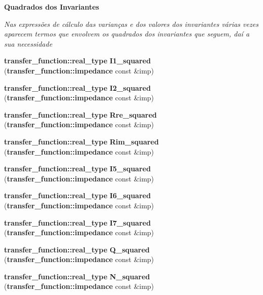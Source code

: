 \begin{Indent}{\bf Quadrados dos Invariantes}\par
{\em Nas expressões de cálculo das varianças e dos valores dos invariantes várias vezes aparecem termos que envolvem os quadrados dos invariantes que seguem, daí a sua necessidade }\begin{CompactItemize}
\item 
{\bf transfer\_\-function::real\_\-type} \textbf{I1\_\-squared} ({\bf transfer\_\-function::impedance} const \&imp)\label{namespaceerro__manual_1_1base__xi__eta_1_1wal__invariant_a3951299a465450f402c2053043f5d00}

\item 
{\bf transfer\_\-function::real\_\-type} \textbf{I2\_\-squared} ({\bf transfer\_\-function::impedance} const \&imp)\label{namespaceerro__manual_1_1base__xi__eta_1_1wal__invariant_766770fb06a63d65221aca48e7554f8e}

\item 
{\bf transfer\_\-function::real\_\-type} \textbf{Rre\_\-squared} ({\bf transfer\_\-function::impedance} const \&imp)\label{namespaceerro__manual_1_1base__xi__eta_1_1wal__invariant_c437846bc3c882b44a6ba9f5e1b71c7a}

\item 
{\bf transfer\_\-function::real\_\-type} \textbf{Rim\_\-squared} ({\bf transfer\_\-function::impedance} const \&imp)\label{namespaceerro__manual_1_1base__xi__eta_1_1wal__invariant_b61607a42558b64b30d4bcb1ab551495}

\item 
{\bf transfer\_\-function::real\_\-type} \textbf{I5\_\-squared} ({\bf transfer\_\-function::impedance} const \&imp)\label{namespaceerro__manual_1_1base__xi__eta_1_1wal__invariant_df55cddb036804893e7cc00b5092e52d}

\item 
{\bf transfer\_\-function::real\_\-type} \textbf{I6\_\-squared} ({\bf transfer\_\-function::impedance} const \&imp)\label{namespaceerro__manual_1_1base__xi__eta_1_1wal__invariant_2f32499869f23ade325cee50f926a40d}

\item 
{\bf transfer\_\-function::real\_\-type} \textbf{I7\_\-squared} ({\bf transfer\_\-function::impedance} const \&imp)\label{namespaceerro__manual_1_1base__xi__eta_1_1wal__invariant_d881cb16a4416226323fd0ceb2372237}

\item 
{\bf transfer\_\-function::real\_\-type} \textbf{Q\_\-squared} ({\bf transfer\_\-function::impedance} const \&imp)\label{namespaceerro__manual_1_1base__xi__eta_1_1wal__invariant_79c6dfb54b1a7a32e655dbdbb1729042}

\item 
{\bf transfer\_\-function::real\_\-type} \textbf{N\_\-squared} ({\bf transfer\_\-function::impedance} const \&imp)\label{namespaceerro__manual_1_1base__xi__eta_1_1wal__invariant_1ff3dd9e38d59e6f5ca543f550dcaefe}

\end{CompactItemize}
\end{Indent}
